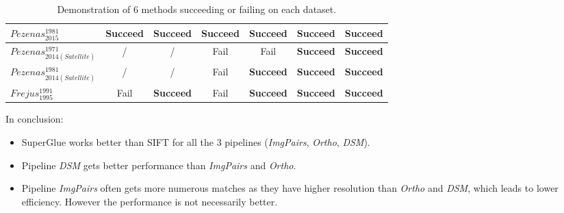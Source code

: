 \begin{table}[htbp]
\begin{tabular}{||l|c|c|c|c|c|c||}
$Pezenas_{2015}^{1981}$ &  \textbf{Succeed}  &  \textbf{Succeed}  &  \textbf{Succeed}  &  \textbf{Succeed}  &  \textbf{Succeed}  &  \textbf{Succeed} \\\hline
$Pezenas_{2014(Satellite)}^{1971}$ & / & / &  Fail  &  Fail  &  \textbf{Succeed}  &  \textbf{Succeed} \\
$Pezenas_{2014(Satellite)}^{1981}$ & / & / &  Fail  &  \textbf{Succeed}  &  \textbf{Succeed}  &  \textbf{Succeed} \\\hline
$Frejus_{1995}^{1991}$ &  Fail  &  \textbf{Succeed}  &  Fail  &  \textbf{Succeed}  &  \textbf{Succeed}  &  \textbf{Succeed} \\\hline
	\end{tabular}
	\caption{Demonstration of 6 methods succeeding or failing on each dataset.}
	\label{succeedorfail}
\end{table}

In conclusion:\\
\begin{itemize}
	\item SuperGlue works better than SIFT for all the 3 pipelines (\textit{ImgPairs}, \textit{Ortho}, \textit{DSM}). 
	\item Pipeline \textit{DSM} gets better performance than \textit{ImgPairs} and \textit{Ortho}.
	\item Pipeline \textit{ImgPairs} often gets more numerous matches as they have higher resolution than \textit{Ortho} and \textit{DSM}, which leads to lower efficiency. However the performance is not necessarily better.
\end{itemize}


